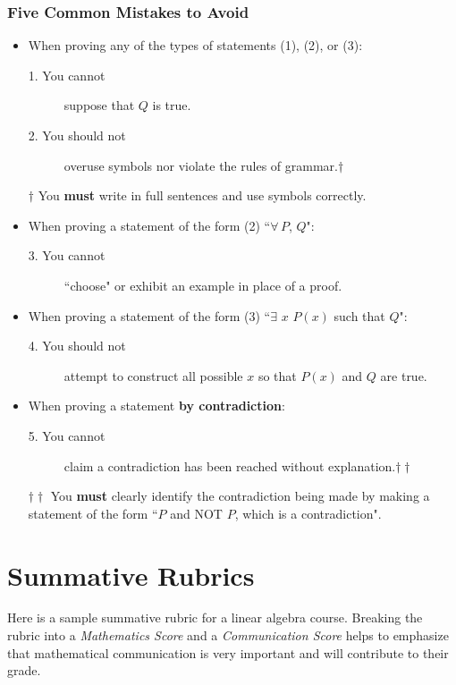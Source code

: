 \documentclass[12pt]{book}
\begin{document}
\subsubsection*{Five Common Mistakes to Avoid}
\begin{itemize}
\item When proving any of the types of statements (1), (2), or (3):
\begin{description}
	\item[1. You cannot] suppose that $Q$ is true.
	\item[2. You should not] overuse symbols nor violate the rules of grammar.$\dagger$
\end{description}

$\dagger$ You \textbf{must} write in full sentences and use symbols correctly.


\item When proving a statement of the form (2) ``$\forall\, P$, $Q$":
\begin{description}
	\item[3. You cannot] ``choose" or exhibit an example in place of a proof.
\end{description}

\item When proving a statement of the form (3) ``$\exists$ $x$ $P(x)$ such that $Q$":
\begin{description}
	\item[4. You should not] attempt to construct all possible $x$ so that $P(x)$ and $Q$ are true. 
\end{description}

\item When proving a statement \textbf{by contradiction}:
\begin{description}
	\item[5. You cannot] claim a contradiction has been reached without explanation.$\dagger\dagger$	
\end{description}

$\dagger\dagger$ You \textbf{must} clearly identify the contradiction being made by making a statement of the form ``$P$ and NOT $P$, which is a contradiction".
\end{itemize}




\section{Summative Rubrics}\label{ch-sum}
Here is a sample summative rubric for a linear algebra course. Breaking the rubric into a \emph{Mathematics Score} and a \emph{Communication Score} helps to emphasize that mathematical communication is very important and will contribute to their grade.
\end{document}
